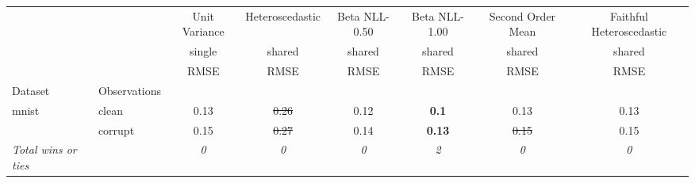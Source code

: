 \begin{tabular}{ll|c|c|c|c|c|c}
\toprule
{} & {} & {Unit Variance} & {Heteroscedastic} & {Beta NLL-0.50} & {Beta NLL-1.00} & {Second Order Mean} & {Faithful Heteroscedastic} \\
{} & {} & {single} & {shared} & {shared} & {shared} & {shared} & {shared} \\
{} & {} & {RMSE} & {RMSE} & {RMSE} & {RMSE} & {RMSE} & {RMSE} \\
{Dataset} & {Observations} & {} & {} & {} & {} & {} & {} \\
\midrule
\multirow[t]{2}{*}{mnist} & clean & 0.13 & \sout{0.26} & 0.12 & \textbf{0.1} & 0.13 & 0.13 \\
 & corrupt & 0.15 & \sout{0.27} & 0.14 & \textbf{0.13} & \sout{0.15} & 0.15 \\
\textit{{Total wins or ties}} &  & \textit{0} & \textit{0} & \textit{0} & \textit{2} & \textit{0} & \textit{0} \\
\bottomrule
\end{tabular}
